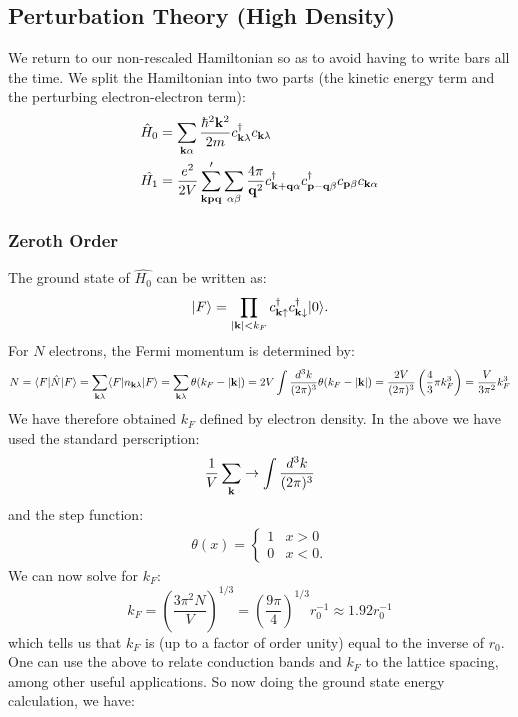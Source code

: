 \subsection{Perturbation Theory (High Density)}
We return to our non-rescaled Hamiltonian so as to avoid having to write bars all the time. We split the Hamiltonian into two parts (the kinetic energy term and the perturbing electron-electron term):
\begin{equation}
    \begin{split}
        \hat{H}_0 &= \sum_{\mathbf{k}\alpha}\frac{\hbar^2\mathbf{k}^2}{2m}c^\dagger_{\mathbf{k}\lambda}c_{\mathbf{k}\lambda}
        \\ \hat{H_1} &= \frac{e^2}{2V}\sum_{\mathbf{k}\mathbf{p}\mathbf{q}}'\sum_{\alpha\beta} \frac{4\pi}{\mathbf{q}^2}c^\dagger_{\mathbf{k} + \mathbf{q}\alpha}c^{\dagger}_{\mathbf{p} - \mathbf{q}\beta}c_{\mathbf{p}\beta}c_{\mathbf{k}\alpha}
    \end{split}
\end{equation} 

\subsubsection{Zeroth Order}
The ground state of $\hat{H_0}$ can be written as:
\begin{equation}
    \lvert F \rangle = \prod_{\lvert \mathbf{k} \rvert < k_F} c^\dagger_{\mathbf{k} \uparrow}c^{\dagger}_{\mathbf{k}\downarrow}\lvert 0 \rangle.
\end{equation}
For $N$ electrons, the Fermi momentum is determined by:
\begin{equation}
    N = \langle F \rvert\hat{N}\lvert F \rangle = \sum_{\mathbf{k}\lambda}\langle F \rvert n_{\mathbf{k}\lambda}\lvert F \rangle = \sum_{\mathbf{k}\lambda}\theta(k_F - \lvert \mathbf{k} \rvert) = 2V\int \frac{d^3k}{(2\pi)^{3}}\theta(k_F - \lvert \mathbf{k} \rvert) = \frac{2V}{(2\pi)^3}\left(\frac{4}{3}\pi k_F^3\right) = \frac{V}{3\pi^2}k_F^3
\end{equation}
We have therefore obtained $k_F$ defined by electron density. In the above we have used the standard perscription:
\begin{equation}
    \frac{1}{V}\sum_{\mathbf{k}} \to \int \frac{d^3k}{(2\pi)^3}
\end{equation}
and the step function:
\begin{align*}
    \theta(x) = \begin{cases}
        1 & x > 0
        \\ 0 & x < 0.
    \end{cases}
\end{align*}
We can now solve for $k_F$:
\begin{equation}
    k_F = \left(\frac{3\pi^2 N}{V}\right)^{1/3} = \left(\frac{9\pi}{4}\right)^{1/3}r_0^{-1} \approx 1.92 r_0^{-1}
\end{equation}
which tells us that $k_F$ is (up to a factor of order unity) equal to the inverse of $r_0$. One can use the above to relate conduction bands and $k_F$ to the lattice spacing, among other useful applications. So now doing the ground state energy calculation, we have:

